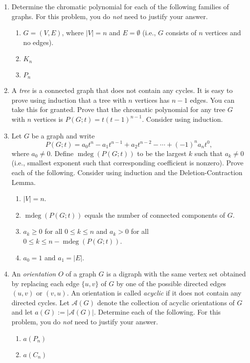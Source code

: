 \documentclass[11pt]{article}%
\theoremstyle{definition}
\DeclareMathOperator{\mdeg}{mdeg}
\DeclareRobustCommand{\rchi}{{\mathpalette\irchi\relax}}
\newcommand{\irchi}[2]{\raisebox{\depth}{$#1\chi$}}
\begin{document}
\begin{enumerate}

\item Determine the chromatic polynomial for each of the following families of graphs. For this problem, you do \emph{not} need to justify your answer.
\begin{enumerate}
\item $G=(V,E)$, where $|V|=n$ and $E=\emptyset$ (i.e., $G$ consists of $n$ vertices and no edges).
\item $K_n$
\item $P_n$
\end{enumerate}

\item A \emph{tree} is a connected graph that does not contain any cycles. It is easy to prove using induction that a tree with $n$ vertices has $n-1$ edges. You can take this for granted. Prove that the chromatic polynomial for any tree $G$ with $n$ vertices is $P(G;t)=t(t-1)^{n-1}$. Consider using induction.

\item Let $G$ be a graph and write
\[
P(G;t)=a_0t^n-a_1t^{n-1}+a_2t^{n-2}-\cdots +(-1)^na_nt^0,
\]
where $a_0\neq 0$. Define $\mdeg(P(G;t))$ to be the largest $k$ such that $a_k\neq 0$ (i.e., smallest exponent such that corresponding coefficient is nonzero). Prove each of the following. Consider using induction and the Deletion-Contraction Lemma.
\begin{enumerate}
\item $|V|=n$.
\item $\mdeg(P(G;t))$ equals the number of connected components of $G$.
\item $a_k\geq 0$ for all $0\leq k\leq n$ and $a_k>0$ for all $0\leq k\leq n-\mdeg(P(G;t))$.
\item $a_0=1$ and $a_1=|E|$.
\end{enumerate}

\item An \emph{orientation} $O$ of a graph $G$ is a digraph with the same vertex set obtained by replacing each edge $\{u,v\}$ of $G$ by one of the possible directed edges $(u,v)$ or $(v,u)$.  An orientation is called \emph{acyclic} if it does not contain any directed cycles.  Let $\mathcal{A}(G)$ denote the collection of acyclic orientations of $G$ and let $a(G):=|\mathcal{A}(G)|$. 
Determine each of the following. For this problem, you do \emph{not} need to justify your answer.
\begin{enumerate}
\item $a(P_n)$
\item $a(C_n)$
\end{enumerate}


\end{enumerate}
\end{document}
